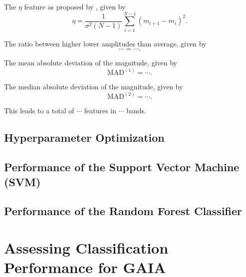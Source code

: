\begin{enumerate}
\litem{$\eta$ ($\cdots$)} The $\eta$ feature as proposed by \citep{}, given by
\begin{equation}\eta = \frac{1}{\sigma^2 (N-1)} \sum\limits_{i=1}^{N-1} (m_{i+1} - m_{i})^2.\end{equation}

 The ratio between higher \resp lower amplitudes than average, given by
\begin{equation}\cdots = \cdots.\end{equation}

 The mean absolute deviation of the magnitude, given by
\begin{equation}\text{MAD}^{(1)} = \cdots.\end{equation}

 The median absolute deviation of the magnitude, given by
\begin{equation}\text{MAD}^{(2)} = \cdots.\end{equation}


\end{enumerate}

This leads to a total of $\cdots$ features in $\cdots$ bands.


\section{Hyperparameter Optimization}


\section{Performance of the Support Vector Machine (SVM)}


\section{Performance of the Random Forest Classifier}


\chapter{Assessing Classification Performance for GAIA}
